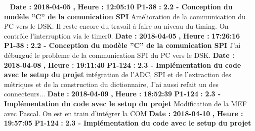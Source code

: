 \documentclass{article}%
\begin{document}
~\newline%
\newline%
%
\textbf{Date : }%
\textbf{2018{-}04{-}05}%
\textbf{,}%
\textbf{ Heure : }%
\textbf{12:05:10}%
\newline%
%
\textbf{P1{-}38 }%
\textbf{ : }%
\textbf{ 2.2 {-} Conception du modèle ''C'' de la comunication SPI}%
\newline%
\newline%
%
Amélioration de la communication du PC vers le DSK. Il reste encore du travail à faire au niveau du timing. On contrôle l'interruption via le timer0.\newline%
\newline%
%
\textbf{Date : }%
\textbf{2018{-}04{-}05}%
\textbf{,}%
\textbf{ Heure : }%
\textbf{17:26:16}%
\newline%
%
\textbf{P1{-}38 }%
\textbf{ : }%
\textbf{ 2.2 {-} Conception du modèle ''C'' de la comunication SPI}%
\newline%
\newline%
%
J'ai débuggué le probleme de la communication SPI du PC vers le DSK.\newline%
\newline%
%
\textbf{Date : }%
\textbf{2018{-}04{-}08}%
\textbf{,}%
\textbf{ Heure : }%
\textbf{19:11:40}%
\newline%
%
\textbf{P1{-}124 }%
\textbf{ : }%
\textbf{ 2.3 {-} Implémentation du code avec le setup du projet}%
\newline%
\newline%
%
intégration de l'ADC, SPI et de l'extraction des métriques et de la construction du dictionnaire, J'ai aussi refait un des connecteurs...\newline%
\newline%
%
\textbf{Date : }%
\textbf{2018{-}04{-}09}%
\textbf{,}%
\textbf{ Heure : }%
\textbf{18:52:39}%
\newline%
%
\textbf{P1{-}124 }%
\textbf{ : }%
\textbf{ 2.3 {-} Implémentation du code avec le setup du projet}%
\newline%
\newline%
%
Modification de la MEF avec Pascal. On est en train d'intégrer la COM\newline%
\newline%
%
\textbf{Date : }%
\textbf{2018{-}04{-}10}%
\textbf{,}%
\textbf{ Heure : }%
\textbf{19:57:05}%
\newline%
%
\textbf{P1{-}124 }%
\textbf{ : }%
\textbf{ 2.3 {-} Implémentation du code avec le setup du projet}%
\newline%
\end{document}
